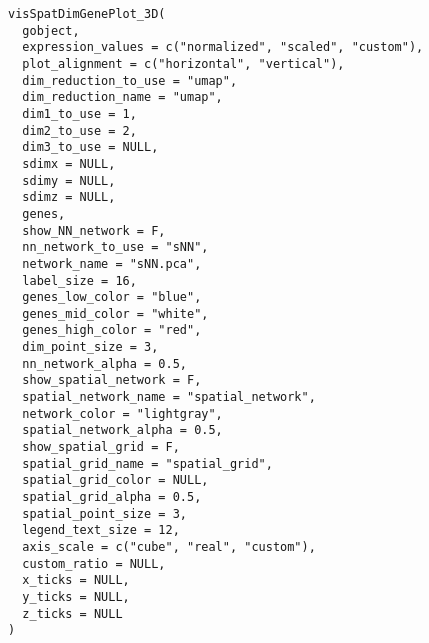 \documentclass[a4paper]{book}
\begin{document}
\begin{Usage}
\begin{verbatim}
visSpatDimGenePlot_3D(
  gobject,
  expression_values = c("normalized", "scaled", "custom"),
  plot_alignment = c("horizontal", "vertical"),
  dim_reduction_to_use = "umap",
  dim_reduction_name = "umap",
  dim1_to_use = 1,
  dim2_to_use = 2,
  dim3_to_use = NULL,
  sdimx = NULL,
  sdimy = NULL,
  sdimz = NULL,
  genes,
  show_NN_network = F,
  nn_network_to_use = "sNN",
  network_name = "sNN.pca",
  label_size = 16,
  genes_low_color = "blue",
  genes_mid_color = "white",
  genes_high_color = "red",
  dim_point_size = 3,
  nn_network_alpha = 0.5,
  show_spatial_network = F,
  spatial_network_name = "spatial_network",
  network_color = "lightgray",
  spatial_network_alpha = 0.5,
  show_spatial_grid = F,
  spatial_grid_name = "spatial_grid",
  spatial_grid_color = NULL,
  spatial_grid_alpha = 0.5,
  spatial_point_size = 3,
  legend_text_size = 12,
  axis_scale = c("cube", "real", "custom"),
  custom_ratio = NULL,
  x_ticks = NULL,
  y_ticks = NULL,
  z_ticks = NULL
)
\end{verbatim}
\end{Usage}
%
\end{document}
